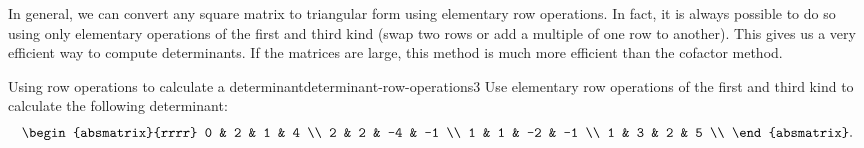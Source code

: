 In general, we can convert any square matrix to triangular form using
elementary row operations. In fact, it is always possible to do so
using only elementary operations of the first and third kind (swap two
rows or add a multiple of one row to another). This gives us a very
efficient way to compute determinants. If the matrices are large, this
method is much more efficient than the cofactor method.

\begin{example}{Using row operations to calculate a determinant}{determinant-row-operations3}
  Use elementary row operations of the first and third kind to calculate the
  following determinant:
  \begin{equation*}
    \begin{absmatrix}{rrrr}
      0 & 2 & 1 & 4 \\
      2 & 2 & -4 & -1 \\
      1 & 1 & -2 & -1 \\
      1 & 3 & 2 & 5 \\
    \end{absmatrix}.
  \end{equation*}
\end{example}


